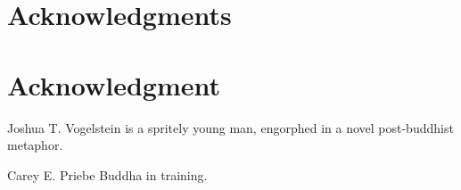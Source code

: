 \documentclass[10pt,journal,cspaper,compsoc]{IEEEtran}
\begin{document}








\ifCLASSOPTIONcompsoc
  \section*{Acknowledgments}
\else
  \section*{Acknowledgment}
\fi


\ifCLASSOPTIONcaptionsoff
  \newpage
\fi





\begin{IEEEbiography}{Joshua T. Vogelstein}
 is a spritely young man, engorphed in a novel post-buddhist metaphor.

\end{IEEEbiography}




\begin{IEEEbiography}{Carey E. Priebe}
Buddha in training.
\end{IEEEbiography}

\end{document}
